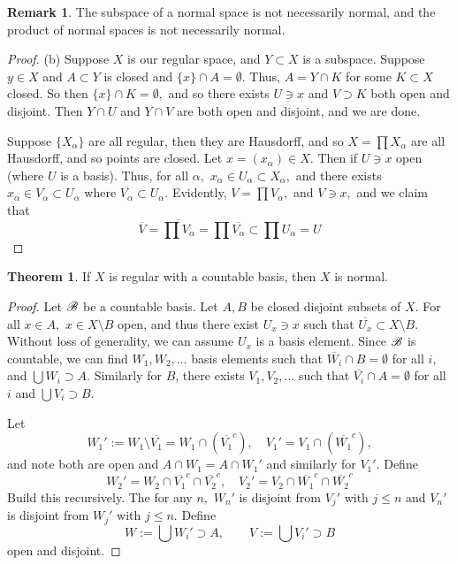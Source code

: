 \documentclass[10pt, oneside]{article}
\theoremstyle{definition}
\newtheorem{thm}{Theorem}
\newtheorem{rem}{Remark}
\begin{document}
\begin{rem}
    The subspace of a normal space is not necessarily normal, and the product of normal spaces is not necessarily normal.
\end{rem}
\begin{proof}
    (b) Suppose $X$ is our regular space, and $Y\subset X$ is a subspace. Suppose $y\in X$ and $A\subset Y$ is closed and $\{x\}\cap A = \emptyset.$ Thus, $A = Y \cap K$ for some $K\subset X$ closed. So then $\{x\}\cap K = \emptyset,$ and so there exists $U\ni x$ and $V\supset K$ both open and disjoint. Then $Y\cap U$ and $Y\cap V$ are both open and disjoint, and we are done.

    Suppose $\{X_\alpha\}$ are all regular, then they are Hausdorff, and so $X = \prod X_\alpha$ are all Hausdorff, and so points are closed. Let $x = (x_\alpha)\in X.$ Then if $U\ni x$ open (where $U$ is a basis). Thus, for all $\alpha,$ $x_\alpha \in U_\alpha \subset X_\alpha,$ and there exists $x_\alpha \in V_\alpha \subset U_\alpha$ where $\overline{V_\alpha}\subset U_\alpha.$ Evidently, $V = \prod V_\alpha,$ and $V\ni x,$ and we claim that 
    \[\overline{V} = \overline{\prod V_\alpha} = \prod \overline{V_\alpha}\subset \prod U_\alpha = U\]
\end{proof}

\begin{thm}
    If $X$ is regular with a countable basis, then $X$ is normal.
\end{thm}
\begin{proof}
    Let $\cal B$ be a countable basis. Let $A,B$ be closed disjoint subsets of $X.$ For all $x\in A,$ $x\in X\setminus B$ open, and thus there exist $U_x\ni x$ such that $\overline{U_x}\subset X\setminus B.$ Without loss of generality, we can assume $U_x$ is a basis element. Since $\cal B$ is countable, we can find $W_1, W_2, \dots$ basis elements such that $\overline{W_i} \cap B = \emptyset$ for all $i,$ and $\bigcup W_i \supset A.$ Similarly for $B$, there exists $V_1, V_2, \dots$ such that $\overline{V_i} \cap A = \emptyset$ for all $i$ and $\bigcup V_i \supset B.$

    Let \[W_1' := W_1\setminus \overline{V_1} = W_1 \cap (\overline{V_1}^c), \quad V_1' = V_1 \cap (\overline{W_1}^c),\] and note both are open and $A\cap W_1 = A\cap W_1'$ and similarly for $V_1'$. Define
    \[W_2' = W_2 \cap \overline{V_1}^c \cap \overline{V_2}^c, \quad V_2' = V_2 \cap \overline{W_1}^c \cap \overline{W_2}^c\] Build this recursively. The for any $n,$ $W_n'$ is disjoint from $V_j'$ with $j\leq n$ and $V_n'$ is disjoint from $W_j'$ with $j\leq n.$ Define 
    \[W:= \bigcup W_i'\supset A, \qquad V:= \bigcup V_i'\supset B\] open and disjoint.
\end{proof}
\end{document}
